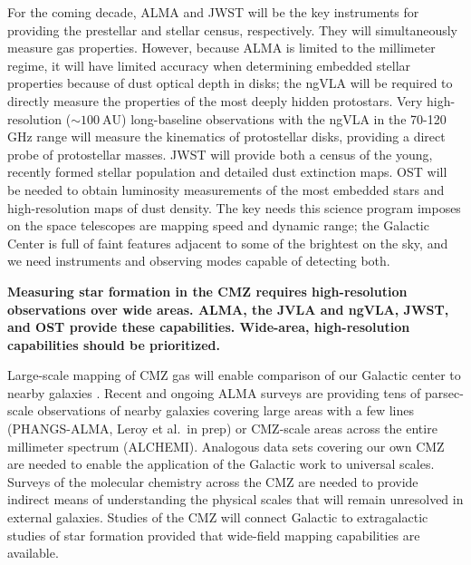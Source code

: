 \documentclass[modern]{aastex62}
\begin{document}
For the coming decade, ALMA and JWST will be the key instruments for providing
the prestellar and stellar census, respectively.  They will simultaneously measure
gas properties.  However, because ALMA is limited to the millimeter regime,
it will have limited accuracy when determining embedded stellar properties because
of dust optical depth in disks; the ngVLA will be required to directly measure
the properties of the most deeply hidden protostars.  Very high-resolution ($\sim100\mathrm{~AU}$)
long-baseline observations with the ngVLA in the 70-120 GHz range will measure
the kinematics of protostellar disks, providing a direct probe of protostellar
masses.  JWST will provide both
a census of the young, recently formed stellar population and detailed dust 
extinction maps.  OST will be needed to obtain luminosity measurements of the
most embedded stars and high-resolution maps of dust density.  The key needs
this science program imposes on the space telescopes are mapping speed
and dynamic range; the Galactic Center is full of faint features adjacent
to some of the brightest on the sky, and we need instruments and observing
modes capable of detecting both.

\textbf{Measuring star formation in the CMZ requires high-resolution
observations over wide areas.  ALMA, the JVLA and ngVLA, JWST, and OST provide
these capabilities.  Wide-area, high-resolution capabilities should be 
prioritized.
}

Large-scale mapping of CMZ gas will enable comparison of our Galactic center to
nearby galaxies \citep[e.g.,][]{Leroy2018a}.
Recent and ongoing ALMA
surveys are providing tens of parsec-scale observations of nearby galaxies
covering large areas with a few lines (PHANGS-ALMA, Leroy et al.\ in prep) or
CMZ-scale areas across the entire millimeter spectrum (ALCHEMI).  Analogous
data sets covering our own CMZ are needed to enable the application
of the Galactic work to universal scales.  Surveys of the molecular
chemistry across the CMZ are needed to provide indirect means of understanding
the physical scales that will remain unresolved in external galaxies.
Studies of the CMZ will connect Galactic to extragalactic studies of star
formation provided that wide-field mapping capabilities are available.
\end{document}
